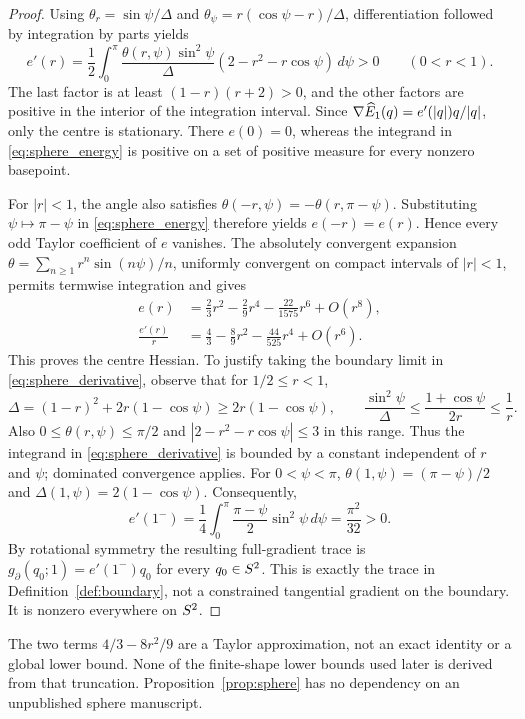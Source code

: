 \begin{proof}
Using $\theta_r=\sin\psi/\Delta$ and $\theta_\psi=r(\cos\psi-r)/\Delta$, differentiation followed by integration by parts yields
\begin{equation}\label{eq:sphere_derivative}
 e'(r)=\frac12\int_0^\pi
 \frac{\theta(r,\psi)\sin^2\psi}{\Delta}
 (2-r^2-r\cos\psi)\,d\psi>0\qquad(0<r<1).
\end{equation}
The last factor is at least $(1-r)(r+2)>0$, and the other factors are positive in the interior of the integration interval. Since $\nabla\widehat E_1(q)=e'(|q|)q/|q|$, only the centre is stationary. There $e(0)=0$, whereas the integrand in \eqref{eq:sphere_energy} is positive on a set of positive measure for every nonzero basepoint.

For $|r|<1$, the angle also satisfies
$\theta(-r,\psi)=-\theta(r,\pi-\psi)$.
Substituting $\psi\mapsto\pi-\psi$ in \eqref{eq:sphere_energy}
therefore yields $e(-r)=e(r)$.
Hence every odd Taylor coefficient of $e$ vanishes.
The absolutely convergent expansion
$\theta=\sum_{n\ge1}r^n\sin(n\psi)/n$,
uniformly convergent on compact intervals of $|r|<1$,
permits termwise integration and gives
\begin{align}
 e(r)&=\frac23r^2-\frac29r^4-\frac{22}{1575}r^6+O(r^8),\label{eq:sphere_series}\\
 \frac{e'(r)}r&=\frac43-\frac89r^2-\frac{44}{525}r^4+O(r^6).\nonumber
\end{align}
This proves the centre Hessian. To justify taking the boundary limit
in \eqref{eq:sphere_derivative}, observe that for $1/2\le r<1$,
\[
 \Delta=(1-r)^2+2r(1-\cos\psi)\ge2r(1-\cos\psi),
 \qquad
 \frac{\sin^2\psi}{\Delta}
 \le\frac{1+\cos\psi}{2r}\le\frac1r.
\]
Also $0\le\theta(r,\psi)\le\pi/2$ and
$|2-r^2-r\cos\psi|\le3$ in this range.
Thus the integrand in \eqref{eq:sphere_derivative} is bounded by a
constant independent of $r$ and $\psi$; dominated convergence applies.
For $0<\psi<\pi$,
$\theta(1,\psi)=(\pi-\psi)/2$ and
$\Delta(1,\psi)=2(1-\cos\psi)$. Consequently,
\[
 e'(1^-)=\frac14\int_0^\pi\frac{\pi-\psi}{2}\sin^2\psi\,d\psi
 =\frac{\pi^2}{32}>0.
\]
By rotational symmetry the resulting full-gradient trace is
$g_\partial(q_0;1)=e'(1^-)q_0$ for every $q_0\in S^2$.
This is exactly the trace in Definition~\ref{def:boundary},
not a constrained tangential gradient on the boundary.
It is nonzero everywhere on $S^2$.
\end{proof}

The two terms $4/3-8r^2/9$ are a Taylor approximation, not an exact identity or a global lower bound. None of the finite-shape lower bounds used later is derived from that truncation. Proposition~\ref{prop:sphere} has no dependency on an unpublished sphere manuscript.

